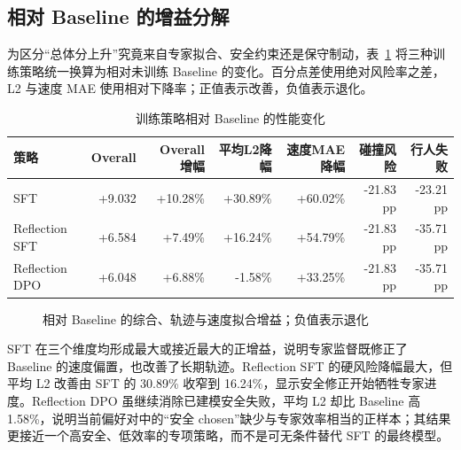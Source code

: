 \documentclass[UTF8,a4paper,12pt,fontset=fandol]{ctexart}
\begin{document}
\subsection{相对 Baseline 的增益分解}
为区分“总体分上升”究竟来自专家拟合、安全约束还是保守制动，表~\ref{tab:baseline-delta} 将三种训练策略统一换算为相对未训练 Baseline 的变化。百分点差使用绝对风险率之差，L2 与速度 MAE 使用相对下降率；正值表示改善，负值表示退化。

\begin{table}[!htbp]
\centering\scriptsize
\caption{训练策略相对 Baseline 的性能变化}\label{tab:baseline-delta}
\begin{tabular}{lrrrrrr}
\toprule
策略 & Overall & Overall增幅 & 平均L2降幅 & 速度MAE降幅 & 碰撞风险 & 行人失败 \\
\midrule
SFT & +9.032 & +10.28\% & +30.89\% & +60.02\% & -21.83 pp & -23.21 pp \\
Reflection SFT & +6.584 & +7.49\% & +16.24\% & +54.79\% & -21.83 pp & -35.71 pp \\
Reflection DPO & +6.048 & +6.88\% & -1.58\% & +33.25\% & -21.83 pp & -35.71 pp \\
\bottomrule
\end{tabular}
\end{table}

\begin{figure}[!htbp]
\centering
{}
\caption{相对 Baseline 的综合、轨迹与速度拟合增益；负值表示退化}
\end{figure}

SFT 在三个维度均形成最大或接近最大的正增益，说明专家监督既修正了 Baseline 的速度偏置，也改善了长期轨迹。Reflection SFT 的硬风险降幅最大，但平均 L2 改善由 SFT 的 30.89\% 收窄到 16.24\%，显示安全修正开始牺牲专家进度。Reflection DPO 虽继续消除已建模安全失败，平均 L2 却比 Baseline 高 1.58\%，说明当前偏好对中的“安全 chosen”缺少与专家效率相当的正样本；其结果更接近一个高安全、低效率的专项策略，而不是可无条件替代 SFT 的最终模型。
\end{document}
